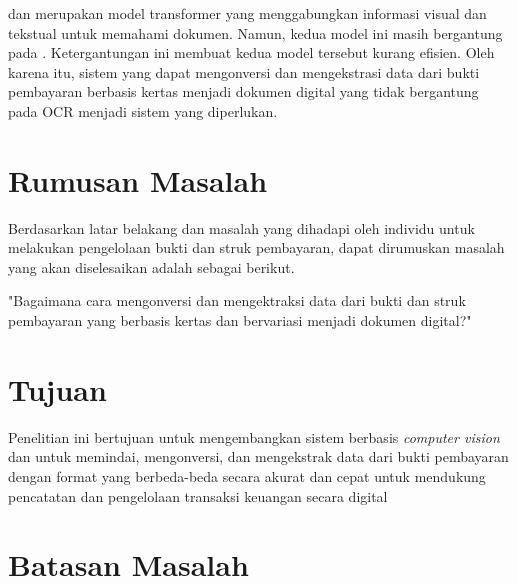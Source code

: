 \layoutlm{} dan \bert{} merupakan model transformer yang menggabungkan informasi visual dan tekstual untuk memahami dokumen. Namun, kedua model ini masih bergantung pada \ocr. Ketergantungan ini membuat kedua model tersebut kurang efisien. Oleh karena itu, sistem yang dapat mengonversi dan mengekstrasi data dari bukti pembayaran berbasis kertas menjadi dokumen digital yang tidak bergantung pada OCR menjadi sistem yang diperlukan. 

\section{Rumusan Masalah}

Berdasarkan latar belakang dan masalah yang dihadapi oleh individu untuk melakukan pengelolaan bukti dan struk pembayaran, dapat dirumuskan masalah yang akan diselesaikan adalah sebagai berikut.

\begin{center}
	"Bagaimana cara mengonversi dan mengektraksi data dari bukti dan struk pembayaran yang berbasis kertas dan bervariasi menjadi dokumen digital?"
\end{center}

\section{Tujuan}

Penelitian ini bertujuan untuk mengembangkan sistem berbasis \emph{computer vision} dan \dl untuk memindai, mengonversi, dan mengekstrak data dari bukti pembayaran dengan format yang berbeda-beda secara akurat dan cepat untuk mendukung pencatatan dan pengelolaan transaksi keuangan secara digital

\section{Batasan Masalah}

